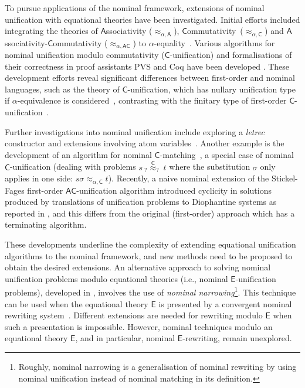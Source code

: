 \documentclass[11pt,a4paper]{amsart}
\newcommand{\caleq}{\approx_{\alpha,\theory{C}}}
\newcommand{\theory}[1]{\ensuremath{\mathsf{#1}}}
\theoremstyle{plain}
\theoremstyle{definition}
\theoremstyle{remark}
\begin{document}
To pursue applications of the nominal framework, extensions of nominal unification with equational theories have been investigated.  Initial efforts included integrating  the theories of \theory{A}ssociativity ($\approx_{\alpha,\theory{A}}$), \theory{C}ommutativity~($\approx_{\alpha,\theory{C}}$) and \theory{A}ssociativity-\theory{C}ommutativity ($\approx_{\alpha,\theory{AC}}$) to $\alpha$-equality~\cite{A-C-AC/tcs/Ayala-RinconSFN19}. Various algorithms for nominal unification modulo commutativity ($\theory{C}$-unification) and formalisations of their correctness in proof assistants PVS and Coq have been developed \cite{lopstr:NominalC-Unif/Washington17,OnSolvingNomFPequations/frocos/Washington17,FPconstraints/Ayala-RinconFN18,FormalisingNomC-unif/mscs/Gabriel21}. These development efforts reveal significant differences between first-order and nominal languages, such as the theory of \theory{C}-unification, which has nullary unification type if $\alpha$-equivalence is considered~\cite{lopstr:NominalC-Unif/Washington17}, contrasting with the finitary type of first-order \theory{C}-unification~\cite{Baader98}. 
 
Further investigations into nominal unification include exploring a \textit{letrec} constructor and extensions involving atom variables~\cite{NomUnif/Schmidt-Schauss22}. Another example is the development of an algorithm for nominal \theory{C}-matching~\cite{AFormalisationofNomCmatching/entcs/Ayala-RinconSFN19}, a special case of nominal \theory{C}-unification (dealing with problems $s\ _?{\overset{\theory{C}}{\approx}}_?\ t$ where the substitution $\sigma$ only applies in one side:  $s\sigma\caleq t$). Recently, a naive nominal extension of the  Stickel-Fages first-order  \theory{AC}-unification algorithm introduced cyclicity in solutions produced by translations of unification problems to Diophantine systems as reported in \cite{CICM:AyalaRinconFSKN23}, and this differs from the original (first-order) approach which has a terminating algorithm.  


These developments underline the complexity of extending equational unification algorithms to the nominal framework, and new methods need to be proposed to obtain the desired extensions. An alternative approach to solving nominal unification problems modulo equational theories (i.e., nominal $\theory{E}$-unification problems), developed in \cite{NominalNarrowing16}, involves the use of {\em nominal narrowing}\footnote{Roughly, nominal narrowing is a generalisation of nominal rewriting by using nominal unification instead of nominal matching in its definition.}. This technique can be used when the equational theory $\theory{E}$ is presented by a convergent nominal rewriting system~\cite{NominalRewriting/FernandezG07,NomSyntax/fct/DominguezF19}. 
Different extensions are needed for rewriting modulo \theory{E} when such a presentation is impossible. However, nominal techniques modulo an equational theory \theory{E}, and in particular, nominal \theory{E}-rewriting, remain unexplored.
\end{document}
